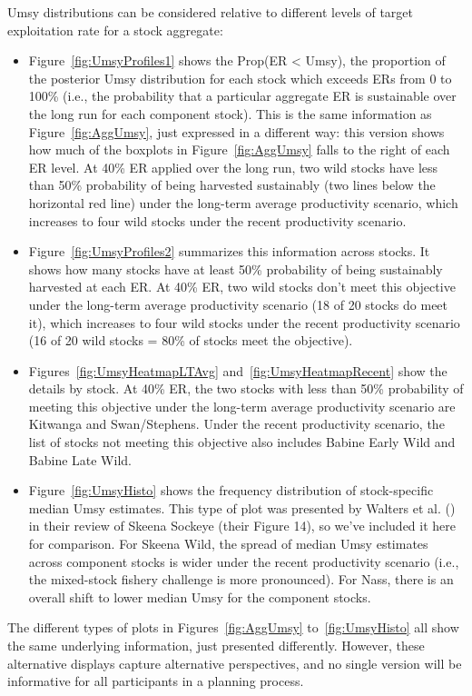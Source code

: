 \documentclass[french,11pt]{book}
\begin{document}
Umsy distributions can be considered relative to different levels of target exploitation rate for a stock aggregate:
\begin{itemize}

\item
  Figure~\ref{fig:UmsyProfiles1} shows the Prop(ER \textless{} Umsy), the proportion of the posterior Umsy distribution for each stock which exceeds ERs from 0 to 100\% (i.e., the probability that a particular aggregate ER is sustainable over the long run for each component stock). This is the same information as Figure~\ref{fig:AggUmsy}, just expressed in a different way: this version shows how much of the boxplots in Figure~\ref{fig:AggUmsy} falls to the right of each ER level. At 40\% ER applied over the long run, two wild stocks have less than 50\% probability of being harvested sustainably (two lines below the horizontal red line) under the long-term average productivity scenario, which increases to four wild stocks under the recent productivity scenario.
\item
  Figure~\ref{fig:UmsyProfiles2} summarizes this information across stocks. It shows how many stocks have at least 50\% probability of being sustainably harvested at each ER. At 40\% ER, two wild stocks don't meet this objective under the long-term average productivity scenario (18 of 20 stocks do meet it), which increases to four wild stocks under the recent productivity scenario (16 of 20 wild stocks = 80\% of stocks meet the objective).
\item
  Figures~\ref{fig:UmsyHeatmapLTAvg} and~\ref{fig:UmsyHeatmapRecent} show the details by stock. At 40\% ER, the two stocks with less than 50\% probability of meeting this objective under the long-term average productivity scenario are Kitwanga and Swan/Stephens. Under the recent productivity scenario, the list of stocks not meeting this objective also includes Babine Early Wild and Babine Late Wild.
\item
  Figure~\ref{fig:UmsyHisto} shows the frequency distribution of stock-specific median Umsy estimates. This type of plot was presented by Walters et al. () in their review of Skeena Sockeye (their Figure 14), so we've included it here for comparison. For Skeena Wild, the spread of median Umsy estimates across component stocks is wider under the recent productivity scenario (i.e., the mixed-stock fishery challenge is more pronounced). For Nass, there is an overall shift to lower median Umsy for the component stocks.
\end{itemize}
The different types of plots in Figures~\ref{fig:AggUmsy} to~\ref{fig:UmsyHisto} all show the same underlying information, just presented differently. However, these alternative displays capture alternative perspectives, and no single version will be informative for all participants in a planning process.
\end{document}
